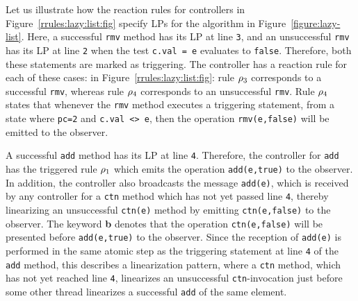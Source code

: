 Let us  illustrate how the reaction rules for controllers in
Figure~\ref{rrules:lazy:list:fig} specify LPs
for the algorithm in Figure~\ref{figure:lazy-list}.
Here, a successful {\tt rmv} method has its LP at
line {\tt 3}, and
an unsuccessful {\tt rmv} has its LP at line {\tt 2} when the test
{\tt c.val = e} evaluates to {\tt false}.
Therefore, both these statements are marked as triggering.
The controller has a reaction rule for each of these cases: in
Figure~\ref{rrules:lazy:list:fig}:
rule $\rho_3$ corresponds to a successful {\tt rmv},
whereas
rule $\rho_4$ corresponds to an unsuccessful {\tt rmv}.
Rule $\rho_4$ states that whenever the {\tt rmv}
method executes a
triggering statement, from a state where {\tt pc=2} and {\tt c.val <> e}, then
the operation {\tt rmv(e,false)} will be emitted to the observer.

A successful {\tt add} method has its LP at line {\tt 4}. Therefore, the
controller for {\tt add} has the triggered rule $\rho_1$ which emits
the operation {\tt add(e,true)} to the observer. In addition, the
controller
also broadcasts the message {\tt add(e)}, which is
received by any controller for a {\tt ctn} method which has not yet
passed line {\tt 4}, thereby
linearizing an unsuccessful {\tt ctn(e)} method by
emitting {\tt ctn(e,false)} to the observer.
  The keyword {\bf b} denotes that the operation
  {\tt ctn(e,false)} will be presented before {\tt add(e,true)} to the observer.
Since the reception of {\tt add(e)} is performed in the same atomic step as the
triggering statement at line {\tt 4} of the {\tt add} method, this
describes a linearization pattern, where
a {\tt ctn} method, which has not yet reached line {\tt 4}, linearizes an
unsuccessful {\tt ctn}-invocation just before some other thread linearizes
a successful {\tt add} of the same element. 

